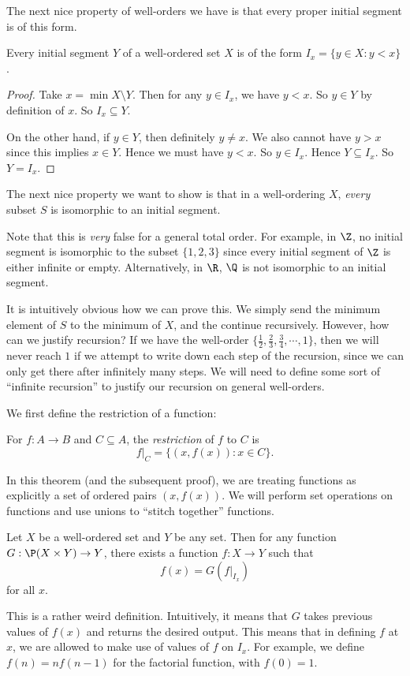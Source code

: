 \documentclass[a4paper]{article}
\begin{document}
The next nice property of well-orders we have is that every proper initial segment is of this form.
\begin{prop}
  Every initial segment $Y$ of a well-ordered set $X$ is of the form $I_x = \{y\in X: y < x\}$.
\end{prop}

\begin{proof}
  Take $x = \min X\setminus Y$. Then for any $y\in I_x$, we have $y < x$. So $y \in Y$ by definition of $x$. So $I_x \subseteq Y$.

  On the other hand, if $y \in Y$, then definitely $y \not= x$. We also cannot have $y > x$ since this implies $x \in Y$. Hence we must have $y < x$. So $y \in I_x$. Hence $Y \subseteq I_x$. So $Y = I_x$.
\end{proof}

The next nice property we want to show is that in a well-ordering $X$, \emph{every} subset $S$ is isomorphic to an initial segment.

Note that this is \emph{very} false for a general total order. For example, in $\Z$, no initial segment is isomorphic to the subset $\{1, 2, 3\}$ since every initial segment of $\Z$ is either infinite or empty. Alternatively, in $\R$, $\Q$ is not isomorphic to an initial segment.

It is intuitively obvious how we can prove this. We simply send the minimum element of $S$ to the minimum of $X$, and the continue recursively. However, how can we justify recursion? If we have the well-order $\{\frac{1}{2}, \frac{2}{3}, \frac{3}{4}, \cdots, 1\}$, then we will never reach $1$ if we attempt to write down each step of the recursion, since we can only get there after infinitely many steps. We will need to define some sort of ``infinite recursion'' to justify our recursion on general well-orders.

We first define the restriction of a function:
\begin{defi}
  For $f: A\to B$ and $C\subseteq A$, the \emph{restriction} of $f$ to $C$ is
  \[
    f|_C = \{(x, f(x)): x\in C\}.
  \]
\end{defi}
In this theorem (and the subsequent proof), we are treating functions as explicitly a set of ordered pairs $(x, f(x))$. We will perform set operations on functions and use unions to ``stitch together'' functions.

\begin{thm}
  Let $X$ be a well-ordered set and $Y$ be any set. Then for any function $G: \P(X\times Y)\to Y$, there exists a function $f:X\to Y$ such that
  \[
    f(x) = G(f|_{I_x})
  \]
  for all $x$.

  This is a rather weird definition. Intuitively, it means that $G$ takes previous values of $f(x)$ and returns the desired output. This means that in defining $f$ at $x$, we are allowed to make use of values of $f$ on $I_x$. For example, we define $f(n) = n f(n - 1)$ for the factorial function, with $f(0) = 1$.
\end{thm}
\end{document}
